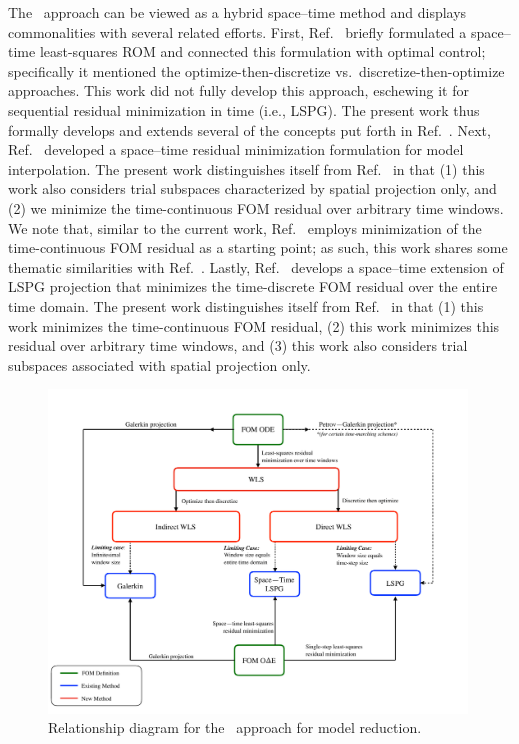 \documentclass[3p,computermodern,10pt]{elsarticle}
\begin{document}
The \methodAcronym\ approach can be viewed as a hybrid space--time method and displays 
commonalities with several related efforts. 
First, Ref.~\cite{bui_thesis} briefly formulated a space--time least-squares ROM
and connected this formulation with optimal control; specifically it mentioned the
optimize-then-discretize vs.\ discretize-then-optimize approaches. This work
did not fully develop this approach, eschewing it 
for 
sequential residual minimization in time (i.e., LSPG). The present work thus
formally develops and extends several of the concepts put forth
in Ref.~\cite{bui_thesis}. Next, Ref.~\cite{constantine_strom} developed a
space--time residual minimization formulation for model interpolation.  The
present work distinguishes itself from Ref.~\cite{constantine_strom} in that
(1) this work also considers trial subspaces characterized by spatial projection only, and (2) we
minimize the time-continuous FOM residual over arbitrary time
windows. We note that,
similar to the current work, Ref.~\cite{constantine_strom} employs
minimization of the time-continuous FOM residual as a starting point; as such,
this work shares some thematic similarities with
Ref.~\cite{constantine_strom}.  Lastly, Ref.~\cite{choi_stlspg} develops a
space--time extension of LSPG projection that minimizes the time-discrete
FOM residual over the entire time domain.  The present work distinguishes
itself from Ref.~\cite{choi_stlspg} in that (1) this work minimizes the
time-continuous FOM residual, (2) this work minimizes this residual over
arbitrary time windows, and (3) this work also considers trial subspaces
associated with spatial projection only.

\begin{figure} 
\begin{centering} 
\includegraphics[trim={0.1cm 0cm 1cm 0cm},clip,width=0.99\textwidth]{diagram.pdf} 
\caption{Relationship diagram for the \methodAcronym\ approach for model
	reduction. } 
\label{fig:flowchart} 
\end{centering} 
\end{figure}
\end{document}
